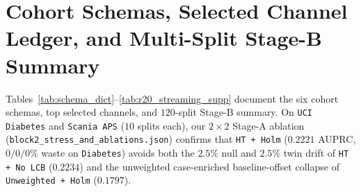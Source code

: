 \documentclass[11pt]{article}
\theoremstyle{remark}
\begin{document}
\section{Cohort Schemas, Selected Channel Ledger, and Multi-Split Stage-B Summary}
\label{app:schemas}

Tables~\ref{tab:schema_dict}--\ref{tab:r20_streaming_supp} document the six cohort schemas, top selected channels, and $120$-split Stage-B summary. On \texttt{UCI Diabetes} and \texttt{Scania APS} ($10$ splits each), our $2 \times 2$ Stage-A ablation (\texttt{block2\_stress\_and\_ablations.json}) confirms that \texttt{HT + Holm} ($0.2221$ AUPRC, $0/0/0\%$ waste on \texttt{Diabetes}) avoids both the $2.5\%$ null and $2.5\%$ twin drift of \texttt{HT + No LCB} ($0.2234$) and the unweighted case-enriched baseline-offset collapse of \texttt{Unweighted + Holm} ($0.1797$).
\end{document}
